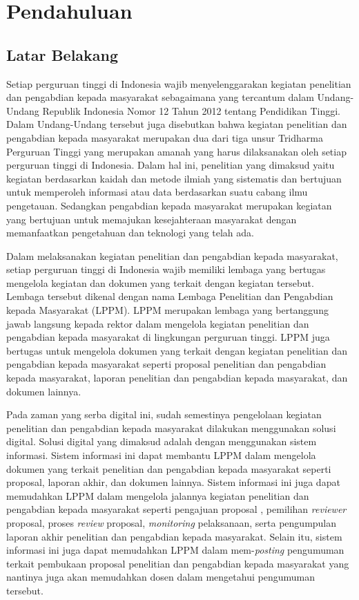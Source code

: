 \chapter{Pendahuluan}

\section{Latar Belakang}

Setiap perguruan tinggi di Indonesia wajib menyelenggarakan kegiatan penelitian dan 
pengabdian kepada masyarakat sebagaimana yang tercantum dalam Undang-Undang Republik
Indonesia Nomor 12 Tahun 2012 tentang Pendidikan Tinggi. Dalam Undang-Undang tersebut
juga disebutkan bahwa kegiatan penelitian dan pengabdian kepada masyarakat merupakan
dua dari tiga unsur Tridharma Perguruan Tinggi yang merupakan amanah yang harus 
dilaksanakan oleh setiap perguruan tinggi di Indonesia. Dalam hal ini, penelitian yang
dimaksud yaitu kegiatan berdasarkan kaidah dan metode ilmiah yang sistematis dan bertujuan 
untuk memperoleh informasi atau data berdasarkan suatu cabang ilmu pengetauan. Sedangkan
pengabdian kepada masyarakat merupakan kegiatan yang bertujuan untuk memajukan kesejahteraan 
masyarakat dengan memanfaatkan pengetahuan dan teknologi yang telah ada.

Dalam melaksanakan kegiatan penelitian dan pengabdian kepada masyarakat, setiap perguruan
tinggi di Indonesia wajib memiliki lembaga yang bertugas mengelola kegiatan dan dokumen yang
terkait dengan kegiatan tersebut. Lembaga tersebut dikenal dengan nama Lembaga Penelitian
dan Pengabdian kepada Masyarakat (LPPM). LPPM merupakan lembaga yang bertanggung jawab
langsung kepada rektor dalam mengelola kegiatan penelitian dan pengabdian kepada masyarakat
di lingkungan perguruan tinggi. LPPM juga bertugas untuk mengelola dokumen yang terkait dengan
kegiatan penelitian dan pengabdian kepada masyarakat seperti proposal penelitian dan pengabdian
kepada masyarakat, laporan penelitian dan pengabdian kepada masyarakat, dan dokumen lainnya.

Pada zaman yang serba digital ini, sudah semestinya pengelolaan kegiatan penelitian dan 
pengabdian kepada masyarakat dilakukan menggunakan solusi digital. Solusi digital yang 
dimaksud adalah dengan menggunakan sistem informasi. Sistem informasi ini dapat membantu
LPPM dalam mengelola dokumen yang terkait penelitian dan pengabdian kepada
masyarakat seperti proposal, laporan akhir, dan dokumen lainnya. Sistem informasi ini juga 
dapat memudahkan LPPM dalam mengelola jalannya kegiatan penelitian dan pengabdian kepada 
masyarakat seperti pengajuan proposal , pemilihan \textit{reviewer} proposal, proses 
\textit{review} proposal, \textit{monitoring} pelaksanaan, serta pengumpulan laporan
akhir penelitian dan pengabdian kepada masyarakat. Selain itu, sistem informasi ini juga
dapat memudahkan LPPM dalam mem-\textit{posting} pengumuman terkait pembukaan proposal penelitian
dan pengabdian kepada masyarakat yang nantinya juga akan memudahkan dosen dalam mengetahui
pengumuman tersebut.

